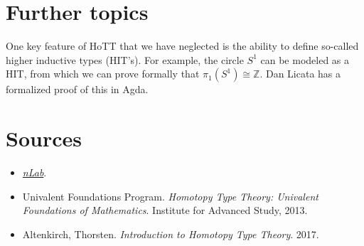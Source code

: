 \documentclass[10pt,letterpaper,cm]{nupset}
\theoremstyle{definition}
\theoremstyle{theorem}
\theoremstyle{remark}
\newcommand{\Z}{\mathbb Z}
\newcommand{\1}{\mathbf{1}}
\newcommand{\0}{\vec 0}
\begin{document}
\section*{Further topics}

One key feature of HoTT that we have neglected is the ability to define so-called higher inductive types (HIT's). For example, the circle $S^1$ can be modeled as a HIT, from which we can prove formally that $\pi_1(S^1) \cong \Z$. Dan Licata has a formalized proof of this in Agda.

\section*{Sources}

\begin{itemize}
\item \href{https://ncatlab.org/nlab/show/HomePage}{\textit{nLab}}.
\item Univalent Foundations Program. \textit{Homotopy Type Theory: Univalent Foundations of Mathematics}. Institute for Advanced Study, 2013.
\item Altenkirch, Thorsten. \textit{Introduction to Homotopy Type Theory}. 2017.
\end{itemize}
\end{document}
